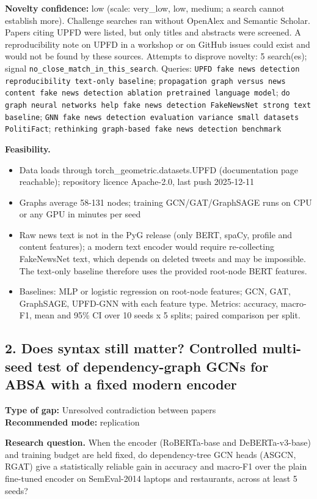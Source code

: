 \documentclass[11pt,a4paper]{article}
\begin{document}
\textbf{Novelty confidence:} low (scale: very\_low, low, medium; a search cannot establish more). Challenge searches ran without OpenAlex and Semantic Scholar. Papers citing UPFD were listed, but only titles and abstracts were screened. A reproducibility note on UPFD in a workshop or on GitHub issues could exist and would not be found by these sources.
Attempts to disprove novelty: 5 search(es); signal \texttt{no\_close\_match\_in\_this\_search}. Queries: \texttt{UPFD fake news detection reproducibility text-only baseline}; \texttt{propagation graph versus news content fake news detection ablation pretrained language model}; \texttt{do graph neural networks help fake news detection FakeNewsNet strong text baseline}; \texttt{GNN fake news detection evaluation variance small datasets PolitiFact}; \texttt{rethinking graph-based fake news detection benchmark}

\textbf{Feasibility.}
\begin{itemize}
\item [V] Data loads through torch\_geometric.datasets.UPFD (documentation page reachable); repository licence Apache-2.0, last push 2025-12-11
\item [E] Graphs average 58-131 nodes; training GCN/GAT/GraphSAGE runs on CPU or any GPU in minutes per seed
\item [E] Raw news text is not in the PyG release (only BERT, spaCy, profile and content features); a modern text encoder would require re-collecting FakeNewsNet text, which depends on deleted tweets and may be impossible. The text-only baseline therefore uses the provided root-node BERT features.
\item [S] Baselines: MLP or logistic regression on root-node features; GCN, GAT, GraphSAGE, UPFD-GNN with each feature type. Metrics: accuracy, macro-F1, mean and 95\% CI over 10 seeds x 5 splits; paired comparison per split.
\end{itemize}

\subsection{2. Does syntax still matter? Controlled multi-seed test of dependency-graph GCNs for ABSA with a fixed modern encoder}
\textbf{Type of gap:} Unresolved contradiction between papers\\
\textbf{Recommended mode:} replication

\textbf{Research question.} When the encoder (RoBERTa-base and DeBERTa-v3-base) and training budget are held fixed, do dependency-tree GCN heads (ASGCN, RGAT) give a statistically reliable gain in accuracy and macro-F1 over the plain fine-tuned encoder on SemEval-2014 laptops and restaurants, across at least 5 seeds?
\end{document}
